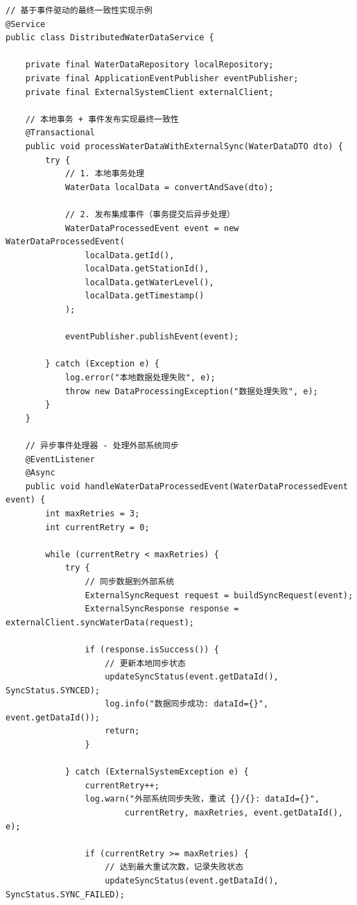 \begin{lstlisting}[style=java]
// 基于事件驱动的最终一致性实现示例
@Service
public class DistributedWaterDataService {
    
    private final WaterDataRepository localRepository;
    private final ApplicationEventPublisher eventPublisher;
    private final ExternalSystemClient externalClient;
    
    // 本地事务 + 事件发布实现最终一致性
    @Transactional
    public void processWaterDataWithExternalSync(WaterDataDTO dto) {
        try {
            // 1. 本地事务处理
            WaterData localData = convertAndSave(dto);
            
            // 2. 发布集成事件（事务提交后异步处理）
            WaterDataProcessedEvent event = new WaterDataProcessedEvent(
                localData.getId(), 
                localData.getStationId(),
                localData.getWaterLevel(),
                localData.getTimestamp()
            );
            
            eventPublisher.publishEvent(event);
            
        } catch (Exception e) {
            log.error("本地数据处理失败", e);
            throw new DataProcessingException("数据处理失败", e);
        }
    }
    
    // 异步事件处理器 - 处理外部系统同步
    @EventListener
    @Async
    public void handleWaterDataProcessedEvent(WaterDataProcessedEvent event) {
        int maxRetries = 3;
        int currentRetry = 0;
        
        while (currentRetry < maxRetries) {
            try {
                // 同步数据到外部系统
                ExternalSyncRequest request = buildSyncRequest(event);
                ExternalSyncResponse response = externalClient.syncWaterData(request);
                
                if (response.isSuccess()) {
                    // 更新本地同步状态
                    updateSyncStatus(event.getDataId(), SyncStatus.SYNCED);
                    log.info("数据同步成功: dataId={}", event.getDataId());
                    return;
                }
                
            } catch (ExternalSystemException e) {
                currentRetry++;
                log.warn("外部系统同步失败，重试 {}/{}: dataId={}", 
                        currentRetry, maxRetries, event.getDataId(), e);
                
                if (currentRetry >= maxRetries) {
                    // 达到最大重试次数，记录失败状态
                    updateSyncStatus(event.getDataId(), SyncStatus.SYNC_FAILED);
                    

\end{lstlisting}
